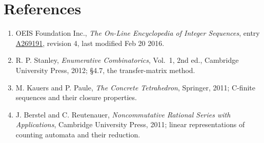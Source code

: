 \documentclass[11pt]{article}
\theoremstyle{definition}
\begin{document}
\section{References}

\begin{enumerate}

\item OEIS Foundation Inc., \emph{The On-Line Encyclopedia of Integer Sequences}, entry \href{https://oeis.org/A269191}{A269191}, revision 4, last modified Feb 20 2016.

\item R. P. Stanley, \emph{Enumerative Combinatorics}, Vol.~1, 2nd ed., Cambridge University Press, 2012; \S4.7, the transfer-matrix method.

\item M. Kauers and P. Paule, \emph{The Concrete Tetrahedron}, Springer, 2011; C-finite sequences and their closure properties.

\item J. Berstel and C. Reutenauer, \emph{Noncommutative Rational Series with Applications}, Cambridge University Press, 2011; linear representations of counting automata and their reduction.

\end{enumerate}
\end{document}
